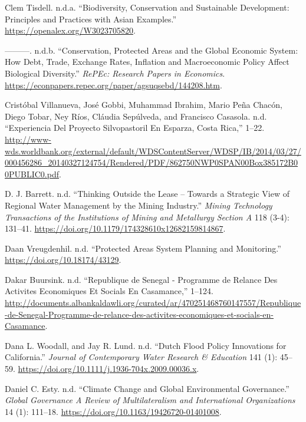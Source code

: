 \begin{CSLReferences}{1}{0}
Clem Tisdell. n.d.a. {``Biodiversity, Conservation and Sustainable
Development: Principles and Practices with Asian Examples.''}
\url{https://openalex.org/W3023705820}.

---------. n.d.b. {``Conservation, Protected Areas and the Global
Economic System: How Debt, Trade, Exchange Rates, Inflation and
Macroeconomic Policy Affect Biological Diversity.''} \emph{RePEc:
Research Papers in Economics}.
\url{https://econpapers.repec.org/paper/agsuqsebd/144208.htm}.

Cristóbal Villanueva, José Gobbi, Muhammad Ibrahim, Mario Peña Chacón,
Diego Tobar, Ney Ríos, Cláudia Sepúlveda, and Francisco Casasola. n.d.
{``Experiencia Del Proyecto Silvopastoril En Esparza, Costa Rica,''}
1--22.
\url{http://www-wds.worldbank.org/external/default/WDSContentServer/WDSP/IB/2014/03/27/000456286_20140327124754/Rendered/PDF/862750NWP0SPAN00Box385172B00PUBLIC0.pdf}.

D. J. Barrett. n.d. {``Thinking Outside the Lease -- Towards a Strategic
View of Regional Water Management by the Mining Industry.''}
\emph{Mining Technology Transactions of the Institutions of Mining and
Metallurgy Section A} 118 (3-4): 131--41.
\url{https://doi.org/10.1179/174328610x12682159814867}.

Daan Vreugdenhil. n.d. {``Protected Areas System Planning and
Monitoring.''} \url{https://doi.org/10.18174/43129}.

Dakar Buursink. n.d. {``Republique de Senegal - Programme de Relance Des
Activites Economiques Et Socials En Casamance,''} 1--124.
\url{http://documents.albankaldawli.org/curated/ar/470251468760147557/Republique-de-Senegal-Programme-de-relance-des-activites-economiques-et-socials-en-Casamance}.

Dana L. Woodall, and Jay R. Lund. n.d. {``Dutch Flood Policy Innovations
for California.''} \emph{Journal of Contemporary Water Research \&
Education} 141 (1): 45--59.
\url{https://doi.org/10.1111/j.1936-704x.2009.00036.x}.

Daniel C. Esty. n.d. {``Climate Change and Global Environmental
Governance.''} \emph{Global Governance A Review of Multilateralism and
International Organizations} 14 (1): 111--18.
\url{https://doi.org/10.1163/19426720-01401008}.


\end{CSLReferences}
